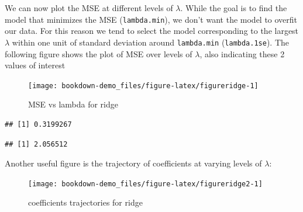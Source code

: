 \documentclass[
]{book}
\newenvironment{Shaded}{\begin{snugshade}}{\end{snugshade}}
\newcommand{\CommentTok}[1]{\textcolor[rgb]{0.56,0.35,0.01}{\textit{#1}}}
\newcommand{\FloatTok}[1]{\textcolor[rgb]{0.00,0.00,0.81}{#1}}
\newcommand{\NormalTok}[1]{#1}
\newcommand{\OtherTok}[1]{\textcolor[rgb]{0.56,0.35,0.01}{#1}}
\newcommand{\SpecialCharTok}[1]{\textcolor[rgb]{0.00,0.00,0.00}{#1}}
\begin{document}
We can now plot the MSE at different levels of \(\lambda\). While the goal is to find the model that minimizes the MSE (\texttt{lambda.min}), we don't want the model to overfit our data. For this reason we tend to select the model corresponding to the largest \(\lambda\) within one unit of standard deviation around \texttt{lambda.min} (\texttt{lambda.1se}). The following figure shows the plot of MSE over levels of \(\lambda\), also indicating these 2 values of interest

\begin{figure}[H]

{\centering \texttt{[image: bookdown-demo\_files/figure-latex/figureridge-1]} 

}

\caption{MSE vs lambda for ridge}\label{fig:figureridge}
\end{figure}

\begin{Shaded}
\end{Shaded}

\begin{verbatim}
## [1] 0.3199267
\end{verbatim}

\begin{Shaded}
\end{Shaded}

\begin{verbatim}
## [1] 2.056512
\end{verbatim}

Another useful figure is the trajectory of coefficients at varying levels of \(\lambda\):

\begin{figure}[H]

{\centering \texttt{[image: bookdown-demo\_files/figure-latex/figureridge2-1]} 

}

\caption{coefficients trajectories for ridge}\label{fig:figureridge2}
\end{figure}
\end{document}
